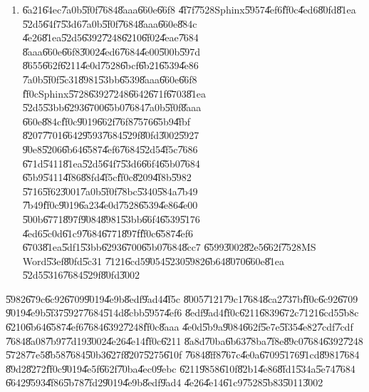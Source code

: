 \begin{enumerate}
\item \U{6a21}\U{64ec}\U{7a0b}\U{5f0f}\U{7684}\U{8aaa}\U{660e}\U{66f8}%
\U{4f7f}\U{7528}Sphinx\U{5957}\U{4ef6}\U{ff0c}\U{4ed6}\U{80fd}\U{81ea}%
\U{52d5}\U{64f7}\U{53d6}\U{7a0b}\U{5f0f}\U{7684}\U{8aaa}\U{660e}\U{884c}%
\U{4e26}\U{81ea}\U{52d5}\U{6392}\U{7248}\U{6210}\U{6f02}\U{4eae}\U{7684}%
\U{8aaa}\U{660e}\U{66f8}\U{3002}\U{4ed6}\U{7684}\U{4e00}\U{500b}\U{597d}%
\U{8655}\U{662f}\U{6211}\U{4e0d}\U{7528}\U{6bcf}\U{6b21}\U{6539}\U{4e86}%
\U{7a0b}\U{5f0f}\U{5c31}\U{8981}\U{53bb}\U{6539}\U{8aaa}\U{660e}\U{66f8}%
\U{ff0c}Sphinx\U{5728}\U{6392}\U{7248}\U{6642}\U{671f}\U{6703}\U{81ea}%
\U{52d5}\U{53bb}\U{6293}\U{6700}\U{65b0}\U{7684}\U{7a0b}\U{5f0f}\U{8aaa}%
\U{660e}\U{884c}\U{ff0c}\U{9019}\U{662f}\U{76f8}\U{7576}\U{65b9}\U{4fbf}%
\U{8207}\U{7701}\U{6642}\U{9593}\U{7684}\U{529f}\U{80fd}\U{3002}\U{5927}%
\U{90e8}\U{5206}\U{6b64}\U{6587}\U{4ef6}\U{7684}\U{52d5}\U{4f5c}\U{7686}%
\U{671d}\U{5411}\U{81ea}\U{52d5}\U{64f7}\U{53d6}\U{66f4}\U{65b0}\U{7684}%
\U{65b9}\U{5411}\U{4f86}\U{88fd}\U{4f5c}\U{ff0c}\U{8209}\U{4f8b}\U{5982}%
\U{5716}\U{5f62}\U{3001}\U{7a0b}\U{5f0f}\U{78bc}\U{5340}\U{584a}\U{7b49}%
\U{7b49}\U{ff0c}\U{9019}\U{6a23}\U{4e0d}\U{7528}\U{6539}\U{4e86}\U{4e00}%
\U{500b}\U{6771}\U{897f}\U{9084}\U{8981}\U{53bb}\U{66f4}\U{6539}\U{5176}%
\U{4ed6}\U{5c0d}\U{61c9}\U{7684}\U{6771}\U{897f}\U{ff0c}\U{6587}\U{4ef6}%
\U{6703}\U{81ea}\U{5df1}\U{53bb}\U{6293}\U{6700}\U{65b0}\U{7684}\U{8cc7}%
\U{6599}\U{3002}\U{82e5}\U{662f}\U{7528}MS Word\U{53ef}\U{80fd}\U{5c31}%
\U{7121}\U{6cd5}\U{9054}\U{5230}\U{5982}\U{6b64}\U{8070}\U{660e}\U{81ea}%
\U{52d5}\U{5316}\U{7684}\U{529f}\U{80fd}\U{3002}
\end{enumerate}

\U{5982}\U{679c}\U{6c92}\U{6709}\U{9019}\U{4e9b}\U{8edf}\U{9ad4}\U{4f5c}%
\U{8005}\U{7121}\U{79c1}\U{7684}\U{8ca2}\U{737b}\U{ff0c}\U{6c92}\U{6709}%
\U{9019}\U{4e9b}\U{5f37}\U{5927}\U{7684}\U{514d}\U{8cbb}\U{5957}\U{4ef6}%
\U{8edf}\U{9ad4}\U{ff0c}\U{6211}\U{6839}\U{672c}\U{7121}\U{6cd5}\U{5b8c}%
\U{6210}\U{6b64}\U{6587}\U{4ef6}\U{7684}\U{6392}\U{7248}\U{ff0c}\U{8aaa}%
\U{4e0d}\U{5b9a}\U{9084}\U{662f}\U{5e7e}\U{5f35}\U{4e82}\U{7cdf}\U{7cdf}%
\U{7684}\U{8a08}\U{7b97}\U{7d19}\U{3002}\U{4e26}\U{4e14}\U{ff0c}\U{6211}%
\U{8a8d}\U{70ba}\U{6b63}\U{78ba}\U{7f8e}\U{89c0}\U{7684}\U{6392}\U{7248}%
\U{5728}\U{77e5}\U{8b58}\U{7684}\U{50b3}\U{627f}\U{8207}\U{5275}\U{610f}%
\U{7684}\U{8ff8}\U{767c}\U{4e0a}\U{6709}\U{5176}\U{91cd}\U{8981}\U{7684}%
\U{89d2}\U{8272}\U{ff0c}\U{9019}\U{4e5f}\U{662f}\U{70ba}\U{4ec0}\U{9ebc}%
\U{6211}\U{9858}\U{610f}\U{82b1}\U{4e86}\U{8fd1}\U{534a}\U{5e74}\U{7684}%
\U{6642}\U{9593}\U{4f86}\U{5b78}\U{7fd2}\U{9019}\U{4e9b}\U{8edf}\U{9ad4}%
\U{4e26}\U{4e14}\U{61c9}\U{7528}\U{5b83}\U{5011}\U{3002}

